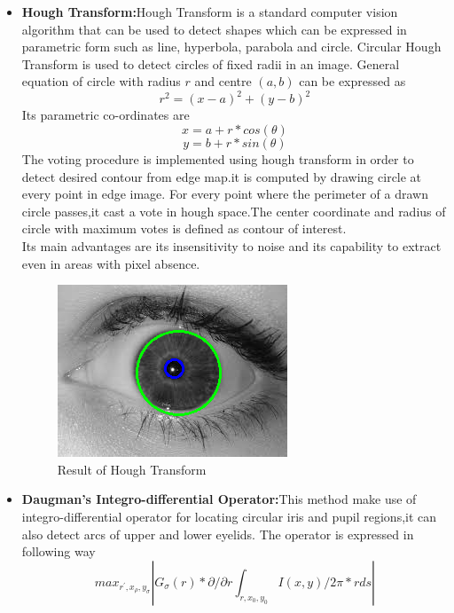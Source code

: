 \documentclass[conference]{Iris_detect}
\begin{document}
\begin{itemize}
    \item \textbf{Hough Transform:}Hough Transform is a standard computer vision algorithm that can be used to detect shapes which can be expressed in parametric form such as line, hyperbola, parabola and circle. Circular Hough Transform is used to detect circles of fixed radii in an image. General equation of circle with radius $r$ and centre $(a,b)$ can be expressed as 
    \begin{equation}
    r^2 =(x-a)^2 +(y-b)^2
    \end{equation}
    Its parametric co-ordinates are
    \begin{equation}
    x=a+r*cos(\theta)
    \end{equation}
    \begin{equation}
    y=b+r*sin(\theta)
    \end{equation}
    The voting procedure is implemented using hough transform in order to detect desired contour from edge map.it is computed by drawing circle at every point in edge image. For every point where the perimeter of a drawn circle passes,it cast a vote in hough space.The center coordinate and radius of circle with maximum votes is defined as contour of interest.\\
    Its main advantages are its insensitivity to noise and its capability to extract even in areas with pixel absence.
    \begin{figure}
\includegraphics{Images/houghman_method_screenshot.png}
\caption{Result of Hough Transform}
\end{figure}
    \item \textbf{Daugman’s Integro-differential Operator:}This method make use of integro-differential operator \cite{daugman}for locating circular iris and pupil regions,it can also detect arcs of upper and lower eyelids. The operator is expressed in following way
    \begin{equation}
    max_{r^{'},x_{\rho},y_{\sigma}}|G_{\sigma}(r)*∂/∂r∫_{r,x_{0},y_{0}}I(x,y)/2\pi*r ds|
   \end{equation}

\end{itemize}
\end{document}
